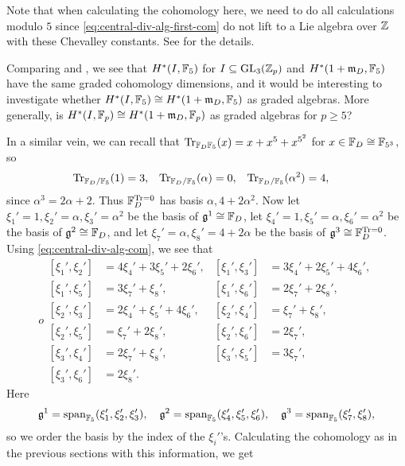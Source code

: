 \begin{remark}
  Note that when calculating the cohomology here, we need to do all calculations modulo $5$ since \eqref{eq:central-div-alg-first-com} do not lift to a Lie algebra over $\mathbb{Z}$ with these Chevalley constants. See \cite{code} for the details.
\end{remark}

Comparing  and , we see that $H^{*}(I,\mathbb{F}_{5})$ for $I \subseteq \operatorname{GL}_{3}(\mathbb{Z}_{p})$ and $H^{*}(1+\mathfrak{m}_{D},\mathbb{F}_{5})$ have the same graded cohomology dimensions, and it would be interesting to investigate whether $H^{*}(I,\mathbb{F}_{5}) \cong H^{*}(1+\mathfrak{m}_{D},\mathbb{F}_{5})$ as graded algebras. More generally, is $H^{*}(I,\mathbb{F}_{p}) \cong H^{*}(1+\mathfrak{m}_{D},\mathbb{F}_{p})$ as graded algebras for $p \geq 5$?

In a similar vein, we can recall that $\operatorname{Tr}_{\mathbb{F}_{D}\mathbb{F}_{5}}(x) = x + x^{5} + x^{5^{2}}$ for $x \in \mathbb{F}_{D} \cong \mathbb{F}_{5^{3}}$, so
\begin{align*}
  \operatorname{Tr}_{\mathbb{F}_{D}/\mathbb{F}_{5}}(1) &= 3, & \operatorname{Tr}_{\mathbb{F}_{D}/\mathbb{F}_{5}}(\alpha) &= 0, & \operatorname{Tr}_{\mathbb{F}_{D}/\mathbb{F}_{5}}(\alpha^{2}) &= 4,
\end{align*}
since $\alpha^{3} = 2\alpha + 2$. Thus $\mathbb{F}_{D}^{\operatorname{Tr} = 0}$ has basis $\alpha, 4+2\alpha^{2}$. Now let $\xi_{1}' = 1, \xi_{2}' = \alpha, \xi_{3}' = \alpha^{2}$ be the basis of $\mathfrak{g}^{1} \cong \mathbb{F}_{D}$, let $\xi_{4}' = 1, \xi_{5}' = \alpha, \xi_{6}' = \alpha^{2}$ be the basis of $\mathfrak{g}^{2} \cong \mathbb{F}_{D}$, and let $\xi_{7}' = \alpha, \xi_{8}' = 4+2\alpha$ be the basis of $\mathfrak{g}^{3} \cong \mathbb{F}_{D}^{\operatorname{Tr} = 0}$. Using \eqref{eq:central-div-alg-com}, we see that
\begin{equation}\label{eq:central-div-alg-second-com}
  o
  \begin{aligned}
    [\xi_{1}',\xi_{2}'] &= 4\xi_{4}' + 3\xi_{5}' + 2\xi_{6}', & [\xi_{1}',\xi_{3}'] &= 3\xi_{4}' + 2\xi_{5}' + 4\xi_{6}', \\
    [\xi_{1}',\xi_{5}'] &= 3\xi_{7}' + \xi_{8}', & [\xi_{1}',\xi_{6}'] &= 2\xi_{7}' + 2\xi_{8}', \\
    [\xi_{2}',\xi_{3}'] &= 2\xi_{4}' + \xi_{5}' + 4\xi_{6}', & [\xi_{2}',\xi_{4}'] &= \xi_{7}' + \xi_{8}', \\
    [\xi_{2}',\xi_{5}'] &= \xi_{7}' + 2\xi_{8}', & [\xi_{2}',\xi_{6}'] &= 2\xi_{7}', \\
    [\xi_{3}',\xi_{4}'] &= 2\xi_{7}' + \xi_{8}', & [\xi_{3}',\xi_{5}'] &= 3\xi_{7}', \\
    [\xi_{3}',\xi_{6}'] &= 2\xi_{8}'.
  \end{aligned}
\end{equation}
Here
\begin{equation*}
  \mathfrak{g}^{1} = \operatorname{span}_{\mathbb{F}_{5}}(\xi_{1}',\xi_{2}',\xi_{3}'), \quad \mathfrak{g}^{2} = \operatorname{span}_{\mathbb{F}_{5}}(\xi_{4}',\xi_{5}',\xi_{6}'), \quad \mathfrak{g}^{3} = \operatorname{span}_{\mathbb{F}_{5}}(\xi_{7}',\xi_{8}'),
\end{equation*}
so we order the basis by the index of the $\xi_{i}'$'s. Calculating the cohomology as in the previous sections with this information, we get 

